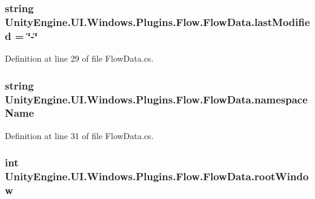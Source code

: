 \subsubsection[{last\+Modified}]{\setlength{\rightskip}{0pt plus 5cm}string Unity\+Engine.\+U\+I.\+Windows.\+Plugins.\+Flow.\+Flow\+Data.\+last\+Modified = \char`\"{}-\/\char`\"{}}\label{class_unity_engine_1_1_u_i_1_1_windows_1_1_plugins_1_1_flow_1_1_flow_data_ac3b2c4cde0989b958f36dbf4977ad25e}


Definition at line 29 of file Flow\+Data.\+cs.

\hypertarget{class_unity_engine_1_1_u_i_1_1_windows_1_1_plugins_1_1_flow_1_1_flow_data_a4f4cb2e635e954cc4ace108b8e1f6960}{}
\subsubsection[{namespace\+Name}]{\setlength{\rightskip}{0pt plus 5cm}string Unity\+Engine.\+U\+I.\+Windows.\+Plugins.\+Flow.\+Flow\+Data.\+namespace\+Name}\label{class_unity_engine_1_1_u_i_1_1_windows_1_1_plugins_1_1_flow_1_1_flow_data_a4f4cb2e635e954cc4ace108b8e1f6960}


Definition at line 31 of file Flow\+Data.\+cs.

\hypertarget{class_unity_engine_1_1_u_i_1_1_windows_1_1_plugins_1_1_flow_1_1_flow_data_a5c9800336aeed1455ed18ffce84ee502}{}
\subsubsection[{root\+Window}]{\setlength{\rightskip}{0pt plus 5cm}int Unity\+Engine.\+U\+I.\+Windows.\+Plugins.\+Flow.\+Flow\+Data.\+root\+Window}\label{class_unity_engine_1_1_u_i_1_1_windows_1_1_plugins_1_1_flow_1_1_flow_data_a5c9800336aeed1455ed18ffce84ee502}


